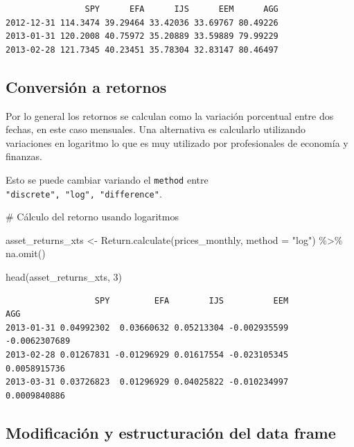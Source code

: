 \documentclass[
  letterpaper,
  DIV=11,
  numbers=noendperiod]{scrartcl}
\newenvironment{Shaded}{\begin{snugshade}}{\end{snugshade}}
\newcommand{\AttributeTok}[1]{\textcolor[rgb]{0.40,0.45,0.13}{#1}}
\newcommand{\CommentTok}[1]{\textcolor[rgb]{0.37,0.37,0.37}{#1}}
\newcommand{\DecValTok}[1]{\textcolor[rgb]{0.68,0.00,0.00}{#1}}
\newcommand{\FunctionTok}[1]{\textcolor[rgb]{0.28,0.35,0.67}{#1}}
\newcommand{\NormalTok}[1]{\textcolor[rgb]{0.00,0.23,0.31}{#1}}
\newcommand{\OtherTok}[1]{\textcolor[rgb]{0.00,0.23,0.31}{#1}}
\newcommand{\SpecialCharTok}[1]{\textcolor[rgb]{0.37,0.37,0.37}{#1}}
\newcommand{\StringTok}[1]{\textcolor[rgb]{0.13,0.47,0.30}{#1}}
\begin{document}
\begin{verbatim}
                SPY      EFA      IJS      EEM      AGG
2012-12-31 114.3474 39.29464 33.42036 33.69767 80.49226
2013-01-31 120.2008 40.75972 35.20889 33.59889 79.99229
2013-02-28 121.7345 40.23451 35.78304 32.83147 80.46497
\end{verbatim}

\subsection{Conversión a retornos}\label{conversiuxf3n-a-retornos}

Por lo general los retornos se calculan como la variación porcentual
entre dos fechas, en este caso mensuales. Una alternativa es calcularlo
utilizando variaciones en logaritmo lo que es muy utilizado por
profesionales de economía y finanzas.

Esto se puede cambiar variando el \texttt{method} entre
\texttt{"discrete",\ "log",\ "difference"}.

\begin{Shaded}
\begin{Highlighting}[]
\CommentTok{\# Cálculo del retorno usando logaritmos}

\NormalTok{asset\_returns\_xts }\OtherTok{\textless{}{-}}
  \FunctionTok{Return.calculate}\NormalTok{(prices\_monthly,}
                   \AttributeTok{method =} \StringTok{"log"}\NormalTok{) }\SpecialCharTok{\%\textgreater{}\%}
  \FunctionTok{na.omit}\NormalTok{()}

\FunctionTok{head}\NormalTok{(asset\_returns\_xts, }\DecValTok{3}\NormalTok{)}
\end{Highlighting}
\end{Shaded}

\begin{verbatim}
                  SPY         EFA        IJS          EEM           AGG
2013-01-31 0.04992302  0.03660632 0.05213304 -0.002935599 -0.0062307689
2013-02-28 0.01267831 -0.01296929 0.01617554 -0.023105345  0.0058915736
2013-03-31 0.03726823  0.01296929 0.04025822 -0.010234997  0.0009840886
\end{verbatim}

\subsection{Modificación y estructuración del data
frame}\label{modificaciuxf3n-y-estructuraciuxf3n-del-data-frame}
\end{document}
